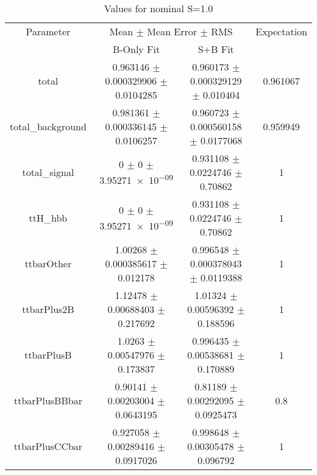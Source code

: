 \begin{table}
\centering
\caption{Values for nominal S=1.0}
\begin{tabular}{cccc}
\toprule
Parameter & \multicolumn{2}{c}{Mean $\pm$ Mean Error $\pm$ RMS} & Expectation\\
 & B-Only Fit & S+B Fit & \\
\midrule
total & \num{0.963146} $\pm$ \num{0.000329906} $\pm$ \num{0.0104285} & \num{0.960173} $\pm$ \num{0.000329129} $\pm$ \num{0.010404} & \num{0.961067}\\
total\_background & \num{0.981361} $\pm$ \num{0.000336145} $\pm$ \num{0.0106257} & \num{0.960723} $\pm$ \num{0.000560158} $\pm$ \num{0.0177068} & \num{0.959949}\\
total\_signal & \num{0} $\pm$ \num{0} $\pm$ \num{3.95271e-09} & \num{0.931108} $\pm$ \num{0.0224746} $\pm$ \num{0.70862} & \num{1}\\
ttH\_hbb & \num{0} $\pm$ \num{0} $\pm$ \num{3.95271e-09} & \num{0.931108} $\pm$ \num{0.0224746} $\pm$ \num{0.70862} & \num{1}\\
ttbarOther & \num{1.00268} $\pm$ \num{0.000385617} $\pm$ \num{0.012178} & \num{0.996548} $\pm$ \num{0.000378043} $\pm$ \num{0.0119388} & \num{1}\\
ttbarPlus2B & \num{1.12478} $\pm$ \num{0.00688403} $\pm$ \num{0.217692} & \num{1.01324} $\pm$ \num{0.00596392} $\pm$ \num{0.188596} & \num{1}\\
ttbarPlusB & \num{1.0263} $\pm$ \num{0.00547976} $\pm$ \num{0.173837} & \num{0.996435} $\pm$ \num{0.00538681} $\pm$ \num{0.170889} & \num{1}\\
ttbarPlusBBbar & \num{0.90141} $\pm$ \num{0.00203004} $\pm$ \num{0.0643195} & \num{0.81189} $\pm$ \num{0.00292095} $\pm$ \num{0.0925473} & \num{0.8}\\
ttbarPlusCCbar & \num{0.927058} $\pm$ \num{0.00289416} $\pm$ \num{0.0917026} & \num{0.998648} $\pm$ \num{0.00305478} $\pm$ \num{0.096792} & \num{1}\\
\bottomrule
\end{tabular}
\end{table}
